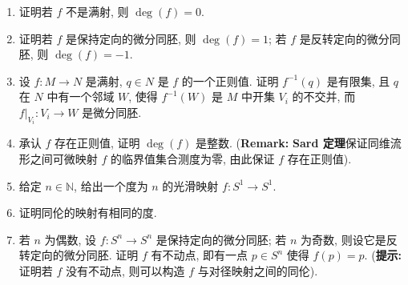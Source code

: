 \begin{RiemannExercise}
\begin{enumerate}[label=(\arabic*),ref=\arabic*,leftmargin=*]
\[\]
\begin{enumerate}[label=(\alph*),leftmargin=*]
\item 证明若 $f$ 不是满射, 则 $\deg(f)=0$.
\item 证明若 $f$ 是保持定向的微分同胚, 则 $\deg(f)=1$; 若 $f$ 是反转定向的微分同胚, 则 $\deg(f)=-1$.
\item 设 $f:M\to N$ 是满射, $q\in N$ 是 $f$ 的一个正则值. 证明 $f^{-1}(q)$ 是有限集, 且 $q$ 在 $N$ 中有一个邻域 $W$, 使得 $f^{-1}(W)$ 是 $M$ 中开集 $V_i$ 的不交并, 而 $f|_{V_i}:V_i\to W$ 是微分同胚.
\item 承认 $f$ 存在正则值, 证明 $\deg(f)$ 是整数.
{\small (\textbf{Remark:} \textbf{Sard 定理}保证同维流形之间可微映射 $f$ 的临界值集合测度为零, 由此保证 $f$ 存在正则值).}
\item 给定 $n\in\mathbb{N}$, 给出一个度为 $n$ 的光滑映射 $f:S^1\to S^1$.
\item 证明同伦的映射有相同的度.
\item 若 $n$ 为偶数, 设 $f:S^n\to S^n$ 是保持定向的微分同胚; 若 $n$ 为奇数, 则设它是反转定向的微分同胚. 证明 $f$ 有不动点, 即有一点 $p\in S^n$ 使得 $f(p)=p$.
{\small (\textbf{提示:} 证明若 $f$ 没有不动点, 则可以构造 $f$ 与对径映射之间的同伦).}
\end{enumerate}
\end{enumerate}
\end{RiemannExercise}
